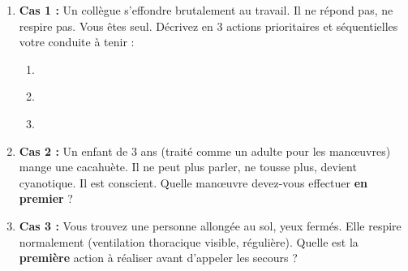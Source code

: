 \documentclass[11pt]{article}
\begin{document}
\begin{exercice}
\begin{enumerate}
    \item \textbf{Cas 1 :} Un collègue s'effondre brutalement au travail. Il ne répond pas, ne respire pas. Vous êtes seul. Décrivez en 3 actions prioritaires et séquentielles votre conduite à tenir :
    \begin{enumerate}
        \item \underline{\hspace{8cm}}
        \item \underline{\hspace{8cm}}
        \item \underline{\hspace{8cm}}
    \end{enumerate}
    \item \textbf{Cas 2 :} Un enfant de 3 ans (traité comme un adulte pour les manœuvres) mange une cacahuète. Il ne peut plus parler, ne tousse plus, devient cyanotique. Il est conscient. Quelle manœuvre devez-vous effectuer \textbf{en premier} ?
    \underline{\hspace{10cm}}
    \item \textbf{Cas 3 :} Vous trouvez une personne allongée au sol, yeux fermés. Elle respire normalement (ventilation thoracique visible, régulière). Quelle est la \textbf{première} action à réaliser avant d'appeler les secours ?
    \underline{\hspace{10cm}}
\end{enumerate}
\end{exercice}
\end{document}
